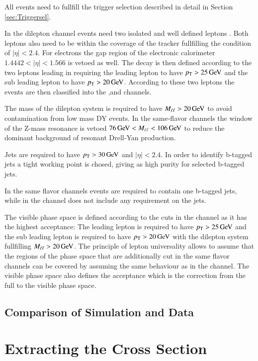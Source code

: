 All events need to fullfill the trigger selection described in detail in Section \ref{sec:Triggersel}.

In the dilepton channel events need two isolated and well defined leptons .
Both leptons also need to be within the coverage of the tracker fullfilling the condition of $|\eta| < 2.4$.
For electrons the gap region of the electronic calorimeter $1.4442<|\eta|<1.566$ is vetoed as well.
The decay is then defined according to the two leptons leading in \pt requiring the leading lepton to have $p_{\mathrm{T}} > 25 \,\text{Ge\hspace{-.08em}V}$
and the sub leading lepton to have $p_{\mathrm{T}} > 20 \,\text{Ge\hspace{-.08em}V}$. 
According to these two leptons the events are then classified into the \emu,\ee and \mumu channels.

The mass of the dilepton system is required to have $M_{\ell\ell} > 20 \,\text{Ge\hspace{-.08em}V}$ to avoid contamination from low mass DY events.
In the same-flavor channels the window of the Z-mass resonance is vetoed $76 \,\text{Ge\hspace{-.08em}V} < M_{\ell\ell} <106 \,\text{Ge\hspace{-.08em}V}$ to reduce the dominant background of 
resonant Drell-Yan production.

Jets are required to have $p_{\mathrm{T}} > 30 \,\text{Ge\hspace{-.08em}V}$ and $|\eta|<2.4$. In order to identify b-tagged jets a tight working point is chosed, giving as high 
purity for selected b-tagged jets.

In the same flavor channels events are required to contain one b-tagged jets, while in the \emu channel does not include any requirement on the jets.

The visible phase space is defined according to the cuts in the \emu channel as it has the highest acceptance:
The leading lepton is required to have $p_{\mathrm{T}} > 25 \,\text{Ge\hspace{-.08em}V}$ and the sub leading lepton is required to have $p_{\mathrm{T}} > 20 \,\text{Ge\hspace{-.08em}V}$ with the dilepton system
fullfilling $M_{\ell\ell} > 20 \,\text{Ge\hspace{-.08em}V}$. The principle of lepton universality allows to assume that the regions of the phase space that are additionally cut in the 
same flavor channels can be covered by assuming the same behaviour as in the \emu channel.
The visible phase space also defines the acceptance which is the correction from the full to the visible phase space.



\subsection{Comparison of Simulation and Data}
\label{sec:xsec_datamc}

\section{Extracting the Cross Section}
\label{sec:xsec_fit}

